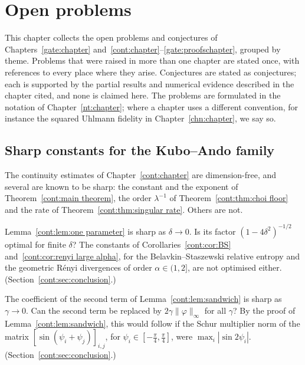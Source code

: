 \chapter{Open problems}\label{op:chapter}
\begingroup

This chapter collects the open problems and conjectures of Chapters~\ref{gate:chapter} and~\ref{cont:chapter}--\ref{gate:proofschapter}, grouped by theme. Problems that were raised in more than one chapter are stated once, with references to every place where they arise. Conjectures are stated as conjectures; each is supported by the partial results and numerical evidence described in the chapter cited, and none is claimed here. The problems are formulated in the notation of Chapter~\ref{nt:chapter}; where a chapter uses a different convention, for instance the squared Uhlmann fidelity in Chapter~\ref{chn:chapter}, we say so.

\section{Sharp constants for the Kubo--Ando family}\label{op:sec:constants}

The continuity estimates of Chapter~\ref{cont:chapter} are dimension-free, and several are known to be sharp: the constant and the exponent of Theorem~\ref{cont:main theorem}, the order $\lambda^{-1}$ of Theorem~\ref{cont:thm:choi floor} and the rate of Theorem~\ref{cont:thm:singular rate}. Others are not.

\begin{problem}\label{op:prob:one parameter}
Lemma~\ref{cont:lem:one parameter} is sharp as $\delta\to0$. Is its factor $(1-4\delta^2)^{-1/2}$ optimal for finite $\delta$? The constants of Corollaries~\ref{cont:cor:BS} and~\ref{cont:cor:renyi large alpha}, for the Belavkin--Staszewski relative entropy and the geometric R\'enyi divergences of order $\alpha\in(1,2]$, are not optimised either. (Section~\ref{cont:sec:conclusion}.)
\end{problem}

\begin{question}\label{op:q:schur}
The coefficient of the second term of Lemma~\ref{cont:lem:sandwich} is sharp as $\gamma\to0$. Can the second term be replaced by $2\gamma\|\varphi\|_\infty$ for all $\gamma$? By the proof of Lemma~\ref{cont:lem:sandwich}, this would follow if the Schur multiplier norm of the matrix $[\sin(\psi_i+\psi_j)]_{i,j}$, for $\psi_i\in[-\frac\pi4,\frac\pi4]$, were $\max_i|\sin2\psi_i|$. (Section~\ref{cont:sec:conclusion}.)
\end{question}


